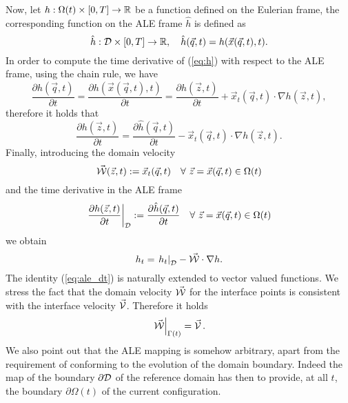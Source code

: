 Now, let $h:\Omega(t)\times [0,T]\to \mathbb R$ be a function defined on the Eulerian
frame, the corresponding function on the ALE frame $\hat h$ is defined as
\begin{equation}\label{eq:h}
\hat h:\mathcal D\times [0,T]\to \mathbb R,\quad \hat h(\vec q,t)=h(\vec x(\vec q,t),t).
\end{equation}
In order to compute the time derivative of (\ref{eq:h}) with respect to the ALE
frame, using the chain rule, we have
\begin{equation}
\frac{\partial\hat h(\vec q,t)}{\partial t}=\frac{\partial h(\vec x(\vec
q,t),t)}{\partial t}=\frac{\partial h(\vec z,t)}{\partial t}+\vec x_t(\vec q,t)
\cdot \nabla h(\vec z,t),
\end{equation}
therefore it holds that
\begin{equation}
\frac{\partial h(\vec z,t)}{\partial t} =
\frac{\partial\hat h(\vec q,t)}{\partial t}-
\vec x_t(\vec q,t) \cdot \nabla h(\vec z,t).
\end{equation}
Finally, introducing the domain velocity
\begin{equation} \label{eq:W}
\vec{\mathcal W}(\vec z, t) := \vec x_t(\vec q, t) \quad \forall\ \vec z = \vec x(\vec q,t)
\in \Omega(t)
\end{equation}
and the time derivative in the ALE frame
\begin{equation} \label{eq:ale_derivative}
\left.\frac{\partial h(\vec z,t)}{\partial t}\right|_{\mathcal D}:=
\frac{\partial\hat h(\vec q,t)}{\partial t} \quad
\forall\ \vec z = \vec x(\vec q,t) \in \Omega(t)
\end{equation}
we obtain
\begin{equation}\label{eq:ale_dt}
h_t =\left.h_t\right|_{\mathcal D} -\vec{\mathcal{W}} \cdot \nabla h.
\end{equation}
The identity (\ref{eq:ale_dt}) is naturally extended to vector valued functions.
We stress the fact that the domain velocity $\vec{\mathcal W}$ for the interface points is
consistent with the interface velocity $\vec{\mathcal{V}}$. Therefore it holds
\begin{equation}
\left.\vec{\mathcal W} \right|_{\Gamma(t)}=\vec{\mathcal{V}}\,.
\end{equation}
We also point out that the ALE mapping is somehow arbitrary, apart from the
requirement of conforming to the evolution of the domain boundary. Indeed the
map of the boundary $\partial \mathcal D$ of the reference domain has then to provide,
at all $t$, the boundary $\partial \Omega(t)$ of the current configuration.

